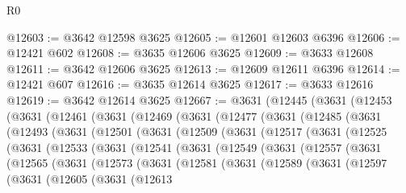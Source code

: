 \begin{lexlean}{R0}
\begin{coremodule}
@12603 := @3642 @12598 @3625
@12605 := @12601 @12603 @6396
@12606 := @12421 @602
@12608 := @3635 @12606 @3625
@12609 := @3633 @12608
@12611 := @3642 @12606 @3625
@12613 := @12609 @12611 @6396
@12614 := @12421 @607
@12616 := @3635 @12614 @3625
@12617 := @3633 @12616
@12619 := @3642 @12614 @3625
@12667 := @3631
    (@12445
      (@3631
        (@12453
          (@3631
            (@12461
              (@3631
                (@12469
                  (@3631
                    (@12477
                      (@3631
                        (@12485
                          (@3631
                            (@12493
                              (@3631
                                (@12501
                                  (@3631
                                    (@12509
                                      (@3631
                                        (@12517
                                          (@3631
                                            (@12525
                                              (@3631
                                                (@12533
                                                  (@3631
                                                    (@12541
                                                      (@3631
                                                        (@12549
                                                          (@3631
                                                            (@12557
                                                              (@3631
                                                                (@12565
                                                                  (@3631
                                                                    (@12573
                                                                      (@3631
                                                                        (@12581
                                                                          (@3631
                                                                            (@12589
                                                                              (@3631
                                                                                (@12597
                                                                                  (@3631
                                                                                    (@12605
                                                                                      (@3631
                                                                                        (@12613

\end{coremodule}
\end{lexlean}
